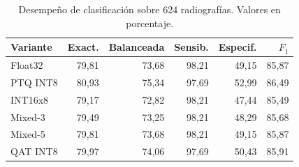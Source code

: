 \begin{table}[H]
\centering\small
\caption{Desempeño de clasificación sobre 624 radiografías. Valores en porcentaje.}\label{tab:xrayres}
\begin{tabularx}{\linewidth}{Yrrrrr}\toprule
Variante & Exact. & Balanceada & Sensib. & Especif. & $F_1$\\\midrule
Float32 & 79,81 & 73,68 & 98,21 & 49,15 & 85,87\\
PTQ INT8 & 80,93 & 75,34 & 97,69 & 52,99 & 86,49\\
INT16x8 & 79,17 & 72,82 & 98,21 & 47,44 & 85,49\\
Mixed-3 & 79,49 & 73,25 & 98,21 & 48,29 & 85,68\\
Mixed-5 & 79,81 & 73,68 & 98,21 & 49,15 & 85,87\\
QAT INT8 & 79,97 & 74,06 & 97,69 & 50,43 & 85,91\\
\bottomrule\end{tabularx}
\end{table}
